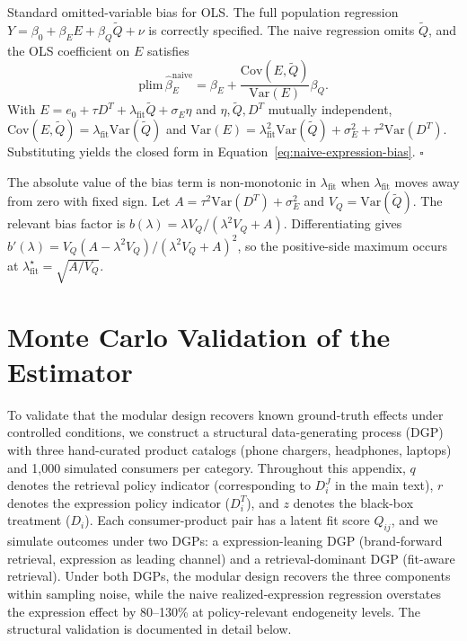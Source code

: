 \documentclass[11pt]{article}
\newcommand{\E}{E}
\newcommand{\Y}{Y}
\newcommand{\Q}{Q}
\newcommand{\Rreg}{D^T}
\begin{document}
Standard omitted-variable bias for OLS. The full population regression $\Y = \beta_0 + \beta_E \E + \beta_Q \tilde{\Q} + \nu$ is correctly specified. The naive regression omits $\tilde{\Q}$, and the OLS coefficient on $\E$ satisfies
\[
\mathrm{plim}\, \hat{\beta}_E^{\mathrm{naive}} = \beta_E + \frac{\mathrm{Cov}(\E, \tilde{\Q})}{\mathrm{Var}(\E)} \beta_Q.
\]
With $\E = e_0 + \tau \Rreg + \lambda_{\mathrm{fit}} \tilde{\Q} + \sigma_E \eta$ and $\eta, \tilde{\Q}, \Rreg$ mutually independent, $\mathrm{Cov}(\E, \tilde{\Q}) = \lambda_{\mathrm{fit}} \mathrm{Var}(\tilde{\Q})$ and $\mathrm{Var}(\E) = \lambda_{\mathrm{fit}}^2 \mathrm{Var}(\tilde{\Q}) + \sigma_E^2 + \tau^2 \mathrm{Var}(\Rreg)$. Substituting yields the closed form in Equation~\eqref{eq:naive-expression-bias}. $\square$

The absolute value of the bias term is non-monotonic in $\lambda_{\mathrm{fit}}$ when $\lambda_{\mathrm{fit}}$ moves away from zero with fixed sign. Let $A = \tau^2\mathrm{Var}(\Rreg)+\sigma_E^2$ and $V_Q=\mathrm{Var}(\tilde{\Q})$. The relevant bias factor is $b(\lambda)=\lambda V_Q/(\lambda^2 V_Q + A)$. Differentiating gives $b'(\lambda)=V_Q(A-\lambda^2V_Q)/(\lambda^2V_Q+A)^2$, so the positive-side maximum occurs at $\lambda_{\mathrm{fit}}^\star=\sqrt{A/V_Q}$.

\section{Monte Carlo Validation of the Estimator}\label{section:dgp}

To validate that the modular design recovers known ground-truth effects under controlled conditions, we construct a structural data-generating process (DGP) with three hand-curated product catalogs (phone chargers, headphones, laptops) and 1{,}000 simulated consumers per category. Throughout this appendix, $q$ denotes the retrieval policy indicator (corresponding to $D_i^J$ in the main text), $r$ denotes the expression policy indicator ($D_i^T$), and $z$ denotes the black-box treatment ($D_i$). Each consumer-product pair has a latent fit score $\Q_{ij}$, and we simulate outcomes under two DGPs: a expression-leaning DGP (brand-forward retrieval, expression as leading channel) and a retrieval-dominant DGP (fit-aware retrieval). Under both DGPs, the modular design recovers the three components within sampling noise, while the naive realized-expression regression overstates the expression effect by 80--130\% at policy-relevant endogeneity levels. The structural validation is documented in detail below.
\end{document}
